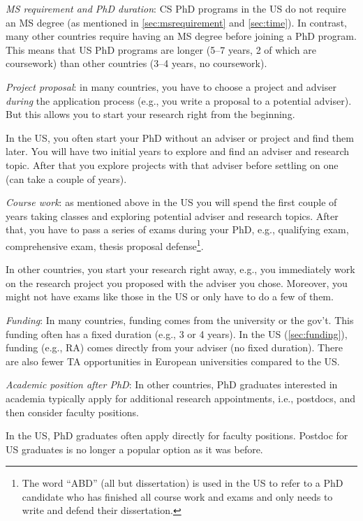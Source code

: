 \documentclass[oneside,11pt,dvipsnames]{book}
\begin{document}
\emph{MS requirement and PhD duration}:  CS PhD programs in the US do not require an MS degree (as mentioned in \autoref{sec:msrequirement} and \autoref{sec:time}).  In contrast, many other countries require having an MS degree before joining a PhD program.  This means that US PhD programs are longer (5--7 years, 2 of which are coursework) than other countries (3--4 years, no coursework).

\emph{Project proposal}: in many countries, you have to choose a project and adviser \emph{during} the application process (e.g., you write a proposal to a potential adviser). But this allows you to start your research right from the beginning. 

In the US, you often start your PhD without an adviser or project and find them later. You will have two initial years to explore and find an adviser and research topic. After that you explore projects with that adviser before settling on one (can take a couple of years). 

\emph{Course work}: as mentioned above in the US you will spend the first couple of years taking classes and exploring potential adviser and research topics. 
After that, you have to pass a series of exams during your PhD, e.g., qualifying exam, comprehensive exam, thesis proposal defense\footnote{The word ``ABD'' (all but dissertation) is used in the US to refer to a PhD candidate who has finished all course work and exams and only needs to write and defend their dissertation.}.

In other countries, you start your research right away, e.g., you immediately work on the research project you proposed with the adviser you chose. Moreover, you might not have exams like those in the US or only have to do a few of them.

\emph{Funding}:  In many countries, funding comes from the university or the gov't. This funding often has a fixed duration (e.g., 3 or 4 years).  In the US (\autoref{sec:funding}), funding (e.g., RA) comes directly from your adviser (no fixed duration).  There are also fewer TA opportunities in European universities compared to the US.

\emph{Academic position after PhD}: In other countries, PhD graduates interested in academia typically apply for additional research appointments, i.e., postdocs, and then consider faculty positions. 

In the US, PhD graduates often apply directly for faculty positions. Postdoc for US graduates is no longer a popular option as it was before.
\end{document}
